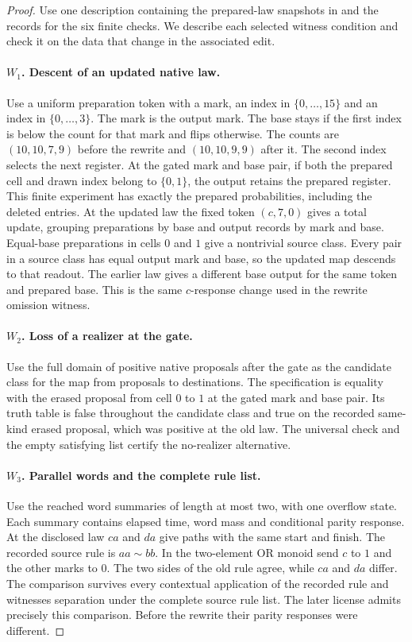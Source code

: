 \begin{proof}
Use one description containing the prepared-law snapshots in
 and the records for the six finite checks. We
describe each selected witness condition and check it on the data
that change in the associated edit.

\paragraph{\(W_1\). Descent of an updated native law.}
Use a uniform preparation token with a mark, an index in
\(\{0,\ldots,15\}\) and an index in \(\{0,\ldots,3\}\).
The mark is the output mark. The base stays if the first index is
below the count for that mark and flips otherwise. The counts are
\((10,10,7,9)\) before the rewrite and \((10,10,9,9)\) after it. The second
index selects the next register. At the gated mark and base pair,
if both the prepared cell and drawn index belong to \(\{0,1\}\),
the output retains the prepared register.
This finite experiment has exactly the prepared probabilities,
including the deleted entries.
At the updated law the fixed token \((c,7,0)\) gives a total
update, grouping preparations by base and output records by mark
and base. Equal-base preparations in cells \(0\) and \(1\) give a
nontrivial source class. Every pair in a source class has equal
output mark and base, so the updated map descends to that
readout. The earlier law gives a different base output for the
same token and prepared base. This is the same \(c\)-response
change used in the rewrite omission witness.

\paragraph{\(W_2\). Loss of a realizer at the gate.}
Use the full domain of positive native proposals after the gate
as the candidate class for the map from proposals to destinations.
The specification is equality with the erased proposal from
cell \(0\) to \(1\) at the gated mark and base pair.
Its truth table is false throughout the candidate class and
true on the recorded same-kind erased proposal, which was
positive at the old law. The universal check and the empty
satisfying list certify the no-realizer alternative.

\paragraph{\(W_3\). Parallel words and the complete rule list.}
Use the reached word summaries of length at most two, with one
overflow state. Each summary contains elapsed time, word mass
and conditional parity response. At the disclosed law \(ca\)
and \(da\) give paths with the same start and finish.
The recorded source rule is \(aa\sim bb\). In the two-element OR
monoid send \(c\) to \(1\) and the other marks to \(0\).
The two sides of the old rule agree, while \(ca\) and \(da\)
differ. The comparison survives every contextual application
of the recorded rule and witnesses separation under the
complete source rule list. The later license admits precisely
this comparison. Before the rewrite their parity responses
were different.


\end{proof}
